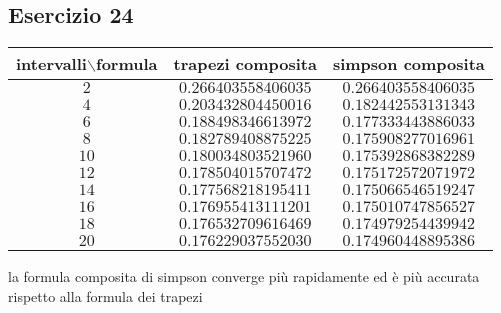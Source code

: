 \subsection{Esercizio 24}
\begin{tabular}{|c|c|c |}
    \hline
    intervalli$\backslash$formula & trapezi composita         &simpson composita\\
    \hline
    $2$                           &$0.266403558406035$        &$0.266403558406035$ \\
    $4$                           &$0.203432804450016$        &$0.182442553131343$ \\
    $6$                           &$0.188498346613972$        &$0.177333443886033$ \\
    $8$                           &$0.182789408875225$        &$0.175908277016961$ \\
    $10$                          &$0.180034803521960$        &$0.175392868382289$ \\
    $12$                          &$0.178504015707472$        &$0.175172572071972$ \\
    $14$                          &$0.177568218195411$        &$0.175066546519247$ \\
    $16$                          &$0.176955413111201$        &$0.175010747856527$ \\
    $18$                          &$0.176532709616469$        &$0.174979254439942$ \\
    $20$                          &$0.176229037552030$        &$0.174960448895386$ \\
    \hline
\end{tabular}
la formula composita di simpson converge più rapidamente ed è più accurata rispetto alla formula dei trapezi